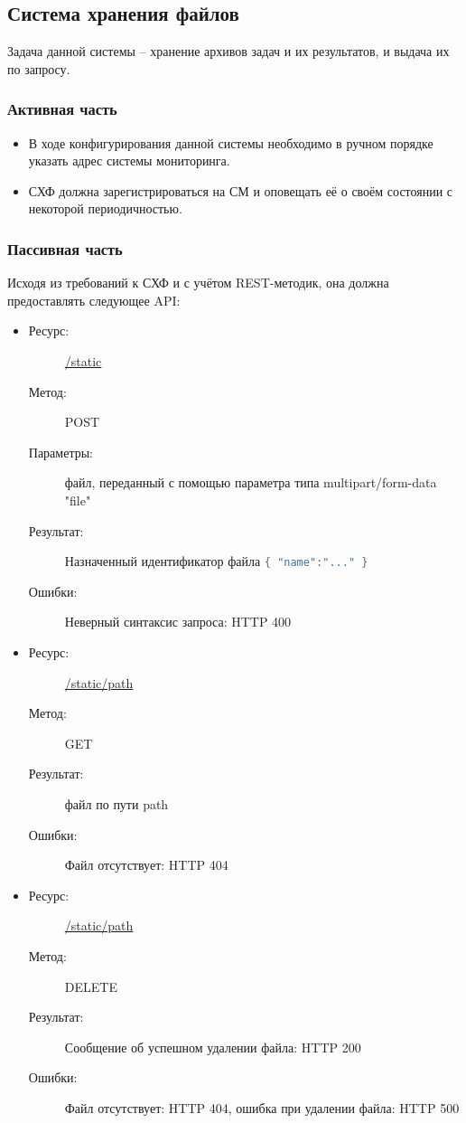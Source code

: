 \documentclass[a4paper,12pt]{report}
\numberwithin{equation}{section}
\begin{document}
  \subsection{Система хранения файлов}
  Задача данной системы -- хранение архивов задач и их результатов, и выдача их по запросу.
  
  \subsubsection{Активная часть}
  \begin{itemize}
    \item В ходе конфигурирования данной системы необходимо в ручном порядке указать адрес системы мониторинга.
    \item СХФ должна зарегистрироваться на СМ и оповещать её о своём состоянии с некоторой периодичностью.
  \end{itemize}
  
  \subsubsection{Пассивная часть}
  Исходя из требований к СХФ и с учётом REST-методик, она должна предоставлять следующее API:
  
  \begin{itemize}
    \item
    \begin{description}
      \item[Ресурс:] \url{/static}
      \item[Метод:] POST
      \item[Параметры:] файл, переданный с помощью параметра типа multipart/form-data "file"
      \item[Результат:] Назначенный идентификатор файла
      \lstinline[language=Java]|{ "name":"..." }|
      \item[Ошибки:] Неверный синтаксис запроса: HTTP 400
    \end{description}
    \item
    \begin{description}
      \item[Ресурс:] \url{/static/path}
      \item[Метод:] GET
      \item[Результат:] файл по пути path
      \item[Ошибки:] Файл отсутствует: HTTP 404
    \end{description}
    \item
    \begin{description}
      \item[Ресурс:] \url{/static/path}
      \item[Метод:] DELETE
      \item[Результат:] Сообщение об успешном удалении файла: HTTP 200
      \item[Ошибки:] Файл отсутствует: HTTP 404, ошибка при удалении файла: HTTP 500
    \end{description}
  \end{itemize}
  
\end{document}
